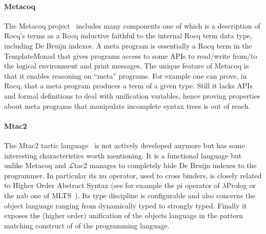 \documentclass[sigplan,natbib=false]{acmart}
\begin{document}
\paragraph{Metacoq} The Metacoq project~\cite{sozeau:hal-02167423}
includes many components one of
which is a description of Rocq's terms as a Rocq inductive faithful to the
internal Rocq term data type, including De Bruijn indexes. A meta
program is essentially a Rocq term in the TemplateMonad that gives programs
access to some APIs to read/write from/to the logical environment and
print messages. 
The unique feature of Metacoq is that it enables reasoning on ``meta''
programs. For example one can prove, in Rocq, that a meta program produces
a term of a given type. Still it lacks APIs and formal definitions to deal
with unification variables, hence proving properties about meta programs
that manipulate incomplete syntax trees is out of reach.

\paragraph{Mtac2} The Mtac2 tactic language~\cite{10.1145/3236773} is
not actively developed anymore but has some interesting characteristics
worth mentioning. It is a functional language but unlike Metacoq and $\mathcal{L}$tac2
manages to completely hide De Bruijn indexes to the programmer.
In particular its nu operator, used to cross binders, is closely related to
Higher Order Abstract Syntax (see for example the pi operator of $\lambda$Prolog or
the nab one of MLTS~\cite{10.1145/3354166.3354177}).
Its type discipline is configurable and also concerns the object
language ranging from dynamically typed to strongly typed.
Finally it exposes the (higher order) unification of the objects language
in the pattern matching construct of of the programming language.

\newpage
\printbibliography
\end{document}
